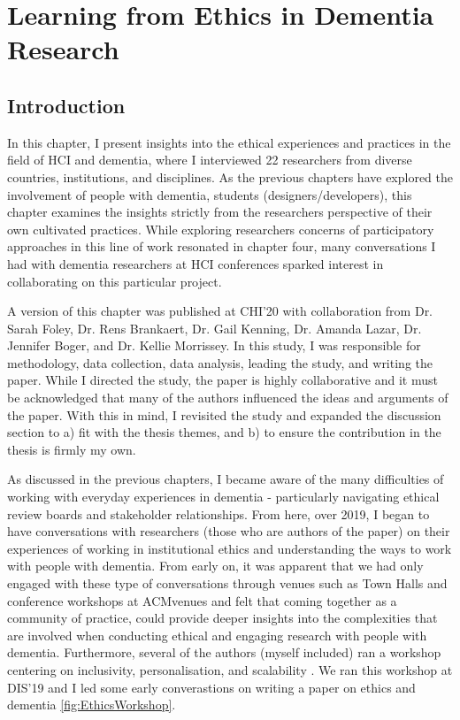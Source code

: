 \chapter{Learning from Ethics in Dementia Research}
\label{EthicsChapter}

\section{Introduction}
\label{Ethics:Intro}
In this chapter, I present insights into the ethical experiences and practices in the field of HCI and dementia, where I interviewed 22 researchers from diverse countries, institutions, and disciplines. As the previous chapters have explored the involvement of people with dementia, students (designers/developers), this chapter examines the insights strictly from the researchers perspective of their own cultivated practices. While exploring researchers concerns of participatory approaches in this line of work resonated in chapter four, many conversations I had with dementia researchers at HCI conferences sparked interest in collaborating on this particular project. 

A version of this chapter was published at CHI'20 \citep{hodge_relational_2020} with collaboration from  Dr. Sarah Foley, Dr. Rens Brankaert, Dr. Gail Kenning, Dr. Amanda Lazar, Dr. Jennifer Boger, and Dr. Kellie Morrissey. In this study, I was responsible for methodology, data collection, data analysis, leading the study, and writing the paper. While I directed the study, the paper is highly collaborative and it must be acknowledged that many of the authors influenced the ideas and arguments of the paper. With this in mind, I revisited the study and expanded the discussion section to a) fit with the thesis themes, and b) to ensure the contribution in the thesis is firmly my own.

As discussed in the previous chapters, I became aware of the many difficulties of working with everyday experiences in dementia - particularly navigating ethical review boards and stakeholder relationships. From here, over 2019, I began to have  conversations with researchers (those who are authors of the paper) on their experiences of working in institutional ethics and understanding the ways to work with people with dementia. From early on, it was apparent that we had only engaged with these type of conversations through venues such as Town Halls \citep{munteanu_sigchi_2019,bruckman_cscw_2017,frauenberger_research_2017} and conference workshops at ACMvenues \citep{waycott_ethical_2015,lazar_hcixdementia_2018} and felt that coming together as a community of practice, could provide deeper insights into the complexities that are involved when conducting ethical and engaging research with people with dementia. Furthermore, several of the authors (myself included) ran a workshop centering on inclusivity, personalisation, and scalability \citep{brankaert_intersections_2019}. We ran this workshop at DIS'19 and I led some early converastions on writing a paper on ethics and dementia \ref{fig:EthicsWorkshop}. 

